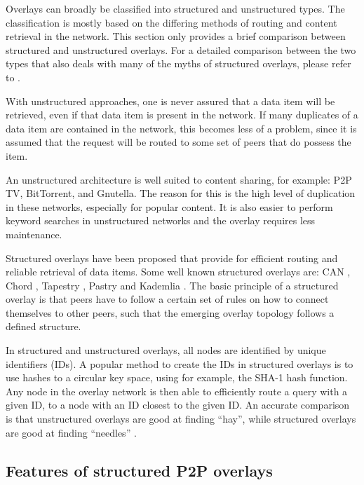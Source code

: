 Overlays can broadly be classified into structured and unstructured types. The classification is mostly based on the differing methods of routing and content retrieval in the network. This section only provides a brief comparison between structured and unstructured overlays. For a detailed comparison between the two types that also deals with many of the myths of structured overlays, please refer to \cite{Castro_structured_overlay_myths}.

With unstructured approaches, one is never assured that a data item will be retrieved, even if that data item is present in the network. If many duplicates of a data item are contained in the network, this becomes less of a problem, since it is assumed that the request will be routed to some set of peers that do  possess the item.

An unstructured architecture is well suited to content sharing, for example: P2P TV, BitTorrent, and Gnutella. The reason for this is the high level of duplication in these networks, especially for popular content. It is also easier to perform keyword searches in unstructured networks and the overlay requires less maintenance.

Structured overlays have been proposed that provide for efficient routing and reliable retrieval of data items. Some well known structured overlays are: CAN \cite{CAN}, Chord \cite{chord}, Tapestry \cite{tapestry}, Pastry \cite{pastry} and Kademlia \cite{Kademlia_Maymounkov}. The basic principle of a structured overlay is that peers have to follow a certain set of rules on how to connect themselves to other peers, such that the emerging overlay topology follows a defined structure.

In structured and unstructured overlays, all nodes are identified by unique identifiers (IDs). A popular method to create the IDs in structured overlays is to use hashes to a circular key space, using for example, the SHA-1 hash function. Any node in the overlay network is then able to efficiently route a query with a given ID, to a node with an ID closest to the given ID. An accurate comparison is that unstructured overlays are good at finding ``hay'', while structured overlays are good at finding ``needles'' \cite{Rodrigues_acm_comms_p2p}.

\subsection{Features of structured P2P overlays}
\label{structured_overlay_features}

